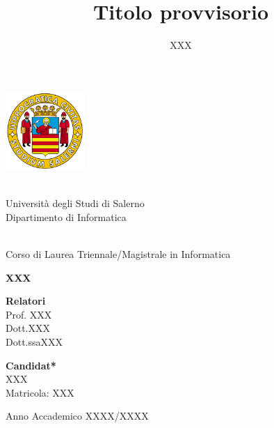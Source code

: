 \documentclass[11pt,oneside,a4paper]{book}
\begin{document}

\title{Titolo provvisorio}
\author{XXX}


\begin{titlepage}
\begin{center}

\includegraphics[width=3cm]{Figure/logo_standard.png}\\
\hfill\\
\begin{spacing}{2.0}
{\LARGE Università degli Studi di Salerno}\\
{\Large Dipartimento di Informatica}\\
\end{spacing}
\hrulefill\\
\vfill
{\Large Corso di Laurea Triennale/Magistrale in Informatica }\\
\vfill\vfill

\begin{spacing}{2.5}
\textbf{\Huge XXX}\\
\end{spacing}
\vfill\vfill

\begin{multicols}{2}
\begin{flushleft}
{\bf Relatori}\\
Prof. XXX\\
Dott.XXX\\
Dott.ssaXXX\\
\end{flushleft}
\columnbreak
\begin{flushright}
{\bf Candidat*}\\
XXX\\
Matricola: XXX\\
\end{flushright}
\end{multicols}

\vfill
\hrulefill 

Anno Accademico XXXX/XXXX

\end{center}
\end{titlepage}
\end{document}
